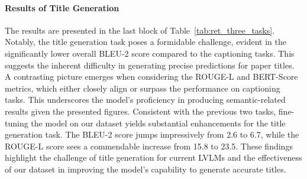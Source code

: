 \paragraph{Results of Title Generation}
The results are presented in the last block of Table~\ref{tab:ret_three_tasks}.
Notably, the title generation task poses a formidable challenge, evident in the significantly lower overall BLEU-2 score compared to the captioning tasks. This suggests the inherent difficulty in generating precise predictions for paper titles.
A contrasting picture emerges when considering the ROUGE-L and BERT-Score metrics, which either closely align or surpass the performance on captioning tasks. This underscores the model's proficiency in producing semantic-related results given the presented figures. 
Consistent with the previous two tasks,
fine-tuning the model on our dataset yields substantial enhancements for the title generation task. The BLEU-2 score jumps impressively from 2.6 to 6.7, while the ROUGE-L score sees a commendable increase from 15.8 to 23.5. 
These findings highlight the challenge of title generation for current LVLMs and the effectiveness of our dataset in improving the model's capability to generate accurate titles.








